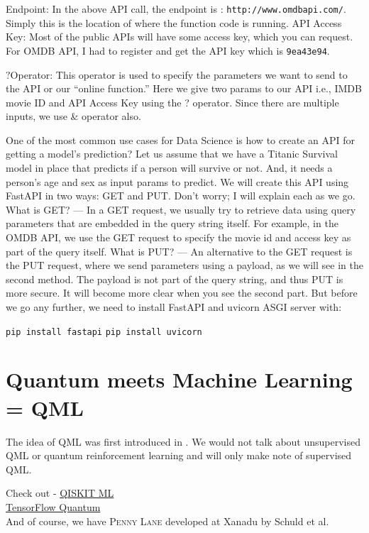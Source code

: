 \documentclass[11pt]{article}
\begin{document}
Endpoint: In the above API call, the endpoint is : \texttt{http://www.omdbapi.com/}. 
Simply this is the location of where the function code is running.
API Access Key: Most of the public APIs will have some access key, which you can request. For OMDB API, I had to register and get the API key which is \texttt{9ea43e94}.

$?$Operator: This operator is used to specify the parameters we want to send to the API or our “online function.” Here we give two params to our API i.e., IMDB movie ID and API Access Key using the ? operator. Since there are multiple inputs, we use \& operator also.

One of the most common use cases for Data Science is how to create an API for getting a model’s prediction? Let us assume that we have a Titanic Survival model in place that predicts if a person will survive or not. And, it needs a person’s age and sex as input params to predict. We will create this API using FastAPI in two ways: GET and PUT. Don’t worry; I will explain each as we go.
What is GET? — In a GET request, we usually try to retrieve data using query parameters that are embedded in the query string itself. For example, in the OMDB API, we use the GET request to specify the movie id and access key as part of the query itself.
What is PUT? — An alternative to the GET request is the PUT request, where we send parameters using a payload, as we will see in the second method. The payload is not part of the query string, and thus PUT is more secure. It will become more clear when you see the second part.
But before we go any further, we need to install FastAPI and uvicorn ASGI server with:

\texttt{pip install fastapi} \newline 
\texttt{pip install uvicorn} \newline





\section{Quantum meets Machine Learning = QML} 

The idea of QML was first introduced in \cite{2013arXiv1307.0411L}. 
We would not talk about unsupervised QML or quantum reinforcement learning and will only 
make note of supervised QML. 


Check out - \href{https://github.com/Qiskit/qiskit-machine-learning}{QISKIT ML}  \\ 
\href{https://github.com/tensorflow/quantum}{TensorFlow Quantum}  \cite{2020arXiv200302989B}  \\ 
And of course, we have \textsc{Penny Lane} developed at Xanadu by Schuld et al. 
\end{document}
